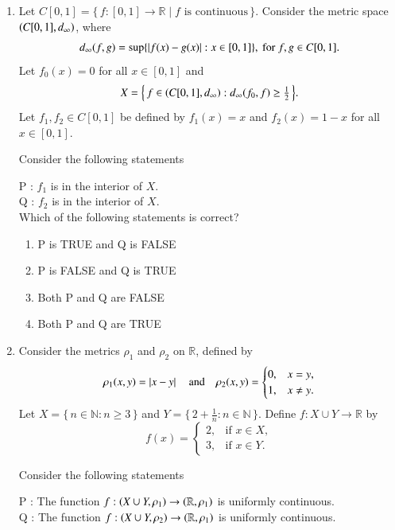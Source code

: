 \documentclass[journal,12pt,onecolumn]{IEEEtran}
\theoremstyle{remark}
\begin{document}
\begin{enumerate}[start=1, label=Q.\arabic*]
\hfill{}


\item Let $C[0,1]=\{\, f : [0,1]\to \mathbb{R} \mid f \text{ is continuous}\,\}$.  
Consider the metric space $\left(C[0,1], d_{\infty}\right)$, where
\[
d_{\infty}(f,g)=\sup\{\left\vert f(x)-g(x)\right\vert : x \in [0,1]\}, \ \text{for } f,g \in C[0,1].
\]
Let $f_{0}(x)=0$ for all $x \in [0,1]$ and
\[
X=\Big\{\, f \in \left(C[0,1], d_{\infty}\right) : d_{\infty}\!\left(f_{0},f\right)\ge \tfrac{1}{2}\,\Big\}.
\]
Let $f_{1}, f_{2} \in C[0,1]$ be defined by $f_{1}(x)=x$ and $f_{2}(x)=1-x$ for all $x \in [0,1]$.  

Consider the following statements\brak{:}

P : $f_{1}$ is in the interior of $X$.\\
Q : $f_{2}$ is in the interior of $X$.\\

Which of the following statements is correct?
\begin{enumerate}
\item P is TRUE and Q is FALSE
\item P is FALSE and Q is TRUE
\item Both P and Q are FALSE
\item Both P and Q are TRUE
\end{enumerate}

\hfill{}


\item Consider the metrics $\rho_{1}$ and $\rho_{2}$ on $\mathbb{R}$, defined by
\[
\rho_{1}(x,y)=\left\vert x-y\right\vert
\quad \text{and} \quad
\rho_{2}(x,y)=
\begin{cases}
0, & x=y,\\
1, & x\ne y.
\end{cases}
\]
Let $X=\{\, n \in \mathbb{N} : n \ge 3 \,\}$ and $Y=\{\, 2+\tfrac{1}{n} : n \in \mathbb{N} \,\}$.  
Define $f : X \cup Y \to \mathbb{R}$ by
\[
f(x)=
\begin{cases}
2, & \text{if } x \in X,\\
3, & \text{if } x \in Y.
\end{cases}
\]

Consider the following statements\brak{:}

P : The function $f : \left(X \cup Y,\rho_{1}\right) \to \left(\mathbb{R},\rho_{1}\right)$ is uniformly continuous.\\
Q : The function $f : \left(X \cup Y,\rho_{2}\right) \to \left(\mathbb{R},\rho_{1}\right)$ is uniformly continuous.\\


\end{enumerate}
\end{document}
